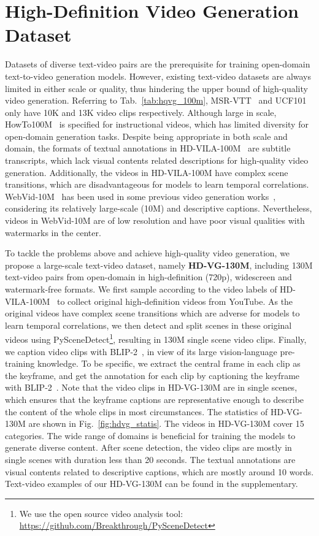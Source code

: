 \documentclass{article}
\begin{document}
\section{High-Definition Video Generation Dataset}
\label{sec:hd_vg}
Datasets of diverse text-video pairs are the prerequisite for training open-domain text-to-video generation models.
However, existing text-video datasets are always limited in either scale or quality, thus hindering the upper bound of high-quality video generation. 
Referring to Tab.~\ref{tab:hqvg_100m}, MSR-VTT~\cite{xu2016msr} and UCF101~\cite{soomro2012ucf101} only have 10K and 13K video clips respectively.
Although large in scale, HowTo100M~\cite{miech2019howto100m} is specified for instructional videos, which has limited diversity for open-domain generation tasks.
Despite being appropriate in both scale and domain, the formats of textual annotations in HD-VILA-100M~\cite{xue2022advancing} are subtitle transcripts, which lack visual contents related descriptions for high-quality video generation.
Additionally, the videos in HD-VILA-100M have complex scene transitions, which are disadvantageous for models to learn temporal correlations.
WebVid-10M~\cite{bain2021frozen} has been used in some previous video generation works~\cite{2022ImagenVideo, MakeAVideo}, considering its relatively large-scale (10M) and descriptive captions.
Nevertheless, videos in WebVid-10M are of low resolution and have poor visual qualities with watermarks in the center. 

To tackle the problems above and achieve high-quality video generation, we propose a large-scale text-video dataset, namely \textbf{HD-VG-130M}, including 130M text-video pairs from open-domain in high-definition (720p), widescreen and watermark-free formats. We first sample according to the video labels of HD-VILA-100M~\cite{xue2022advancing} to collect original high-definition videos from YouTube.
As the original videos have complex scene transitions which are adverse for models to learn temporal correlations, we then detect and split scenes in these original videos using PySceneDetect\footnote{We use the open source video analysis tool: \url{https://github.com/Breakthrough/PySceneDetect}}, resulting in 130M single scene video clips.
Finally, we caption video clips with BLIP-2~\cite{li2023blip}, in view of its large vision-language pre-training knowledge.
To be specific, we extract the central frame in each clip as the keyframe, and get the annotation for each clip by captioning the keyframe with BLIP-2~\cite{li2023blip}. Note that the video clips in HD-VG-130M are in single scenes, which ensures that the keyframe captions are representative enough to describe the content of the whole clips in most circumstances. The statistics of HD-VG-130M are shown in Fig.~\ref{fig:hdvg_statis}. The videos in HD-VG-130M cover 15 categories. The wide range of domains is beneficial for training the models to generate diverse content. After scene detection, the video clips are mostly in single scenes with duration less than 20 seconds. The textual annotations are visual contents related to descriptive captions, which are mostly around 10 words. Text-video examples of our HD-VG-130M can be found in the supplementary.
\end{document}
